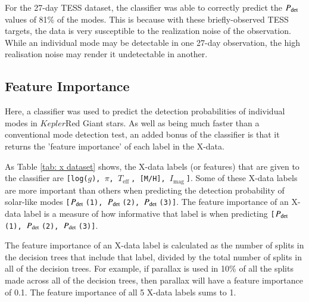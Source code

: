 \documentclass[a4paper,fleqn,usenatbib,useAMS]{mnras}
\newcommand{\teff}{\ensuremath{T_{\textrm{eff}}\:}}
\newcommand{\kep}{\ensuremath{Kepler}\:}
\newcommand{\pdet}{\ensuremath{P_{\rm det}\:}}
\newcommand{\imag}{\ensuremath{I_{\textrm{mag}}\:}}
\begin{document}
For the 27-day TESS dataset, the classifier was able to correctly predict the \pdet values of 81\% of the modes. This is because with these briefly-observed TESS targets, the data is very susceptible to the realization noise of the observation. While an individual mode may be detectable in one 27-day observation, the high realisation noise may render it undetectable in another.


\subsection{Feature Importance}
\label{sect: feature importance}

Here, a classifier was used to predict the detection probabilities of individual modes in \kep Red Giant stars. As well as being much faster than a conventional mode detection test, an added bonus of the classifier is that it returns the 'feature importance' of each label in the X-data.

As Table \ref{tab: x dataset} shows, the X-data labels (or features) that are given to the classifier are \texttt{[log($g$), $\pi$, \teff, [M/H], \imag]}. Some of these X-data labels are more important than others when predicting the detection probability of solar-like modes \texttt{[\pdet(1), \pdet(2), \pdet(3)]}. The feature importance of an X-data label is a measure of how informative that label is when predicting \texttt{[\pdet(1), \pdet(2), \pdet(3)]}.

The feature importance of an X-data label is calculated as the number of splits in the decision trees that include that label, divided by the total number of splits in all of the decision trees. For example, if parallax is used in 10\% of all the splits made across all of the decision trees, then parallax will have a feature importance of 0.1. The feature importance of all 5 X-data labels sums to 1.
\end{document}
